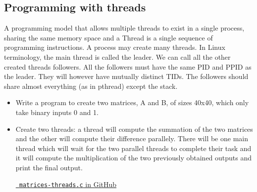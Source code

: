 \documentclass[12pt]{article}
\begin{document}
\subsection{Programming with threads}
A programming model that allows multiple threads to exist in a
single process, sharing the same memory space and a Thread is a
single sequence of programming instructions.
A process may create many threads. In Linux terminology, the main
thread is called the leader. We can call all the other created
threads followers. All the followers must have the same PID and PPID
as the leader. They will however have mutually distinct TIDs. The
followers should share almost everything (as in pthread) except the
stack.
\begin{itemize}
    \item Write a program to create two matrices, A and B, of sizes 40x40, which only take binary inputs 0 and 1.
    \item Create two threads: a thread will compute the summation of the two matrices and the other will compute their difference parallely. There will be one main thread which will wait for the two parallel threads to complete their task and it will compute the multiplication of the two previously obtained outputs and print the final output.

    \begin{center}
    \href{https://github.com/jucollas/parallel-programming/blob/main/practical-session-1/scripts/cfiles/matrices-threads.c}{\faGithub\ \texttt{matrices-threads.c} in GitHub}
    \end{center}
\end{itemize}
\end{document}
